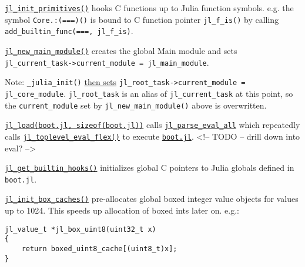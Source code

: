 \href{https://github.com/JuliaLang/julia/blob/master/src/builtins.c}{\texttt{jl\_init\_primitives()}} hooks C functions up to Julia function symbols. e.g. the symbol \texttt{Core.:(===)()} is bound to C function pointer \texttt{jl\_f\_is()} by calling \texttt{add\_builtin\_func({\textquotedbl}==={\textquotedbl}, jl\_f\_is)}.



\href{https://github.com/JuliaLang/julia/blob/master/src/toplevel.c}{\texttt{jl\_new\_main\_module()}} creates the global {\textquotedbl}Main{\textquotedbl} module and sets \texttt{jl\_current\_task->current\_module = jl\_main\_module}.



Note: \texttt{\_julia\_init()} \href{https://github.com/JuliaLang/julia/blob/master/src/init.c}{then sets} \texttt{jl\_root\_task->current\_module = jl\_core\_module}. \texttt{jl\_root\_task} is an alias of \texttt{jl\_current\_task} at this point, so the \texttt{current\_module} set by \texttt{jl\_new\_main\_module()} above is overwritten.



\href{https://github.com/JuliaLang/julia/blob/master/src/init.c}{\texttt{jl\_load({\textquotedbl}boot.jl{\textquotedbl}, sizeof({\textquotedbl}boot.jl{\textquotedbl}))}} calls \href{https://github.com/JuliaLang/julia/blob/master/src/ast.c}{\texttt{jl\_parse\_eval\_all}} which repeatedly calls \href{https://github.com/JuliaLang/julia/blob/master/src/toplevel.c}{\texttt{jl\_toplevel\_eval\_flex()}} to execute \href{https://github.com/JuliaLang/julia/blob/master/base/boot.jl}{\texttt{boot.jl}}. <!– TODO – drill down into eval? –>



\href{https://github.com/JuliaLang/julia/blob/master/src/init.c}{\texttt{jl\_get\_builtin\_hooks()}} initializes global C pointers to Julia globals defined in \texttt{boot.jl}.



\href{https://github.com/JuliaLang/julia/blob/master/src/datatype.c}{\texttt{jl\_init\_box\_caches()}} pre-allocates global boxed integer value objects for values up to 1024. This speeds up allocation of boxed ints later on. e.g.:




\begin{lstlisting}
jl_value_t *jl_box_uint8(uint32_t x)
{
    return boxed_uint8_cache[(uint8_t)x];
}
\end{lstlisting}



